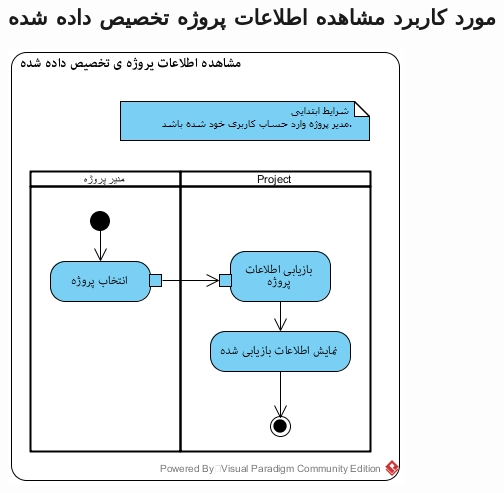 \subsection*{مورد کاربرد مشاهده اطلاعات پروژه تخصیص داده شده}
\vspace{2cm}
\begin{center}
\includegraphics[width=\textwidth]{ActivityDiagramsWithSwimlanes/17.jpg}
\end{center}

\newpage
\vspace{2cm}
